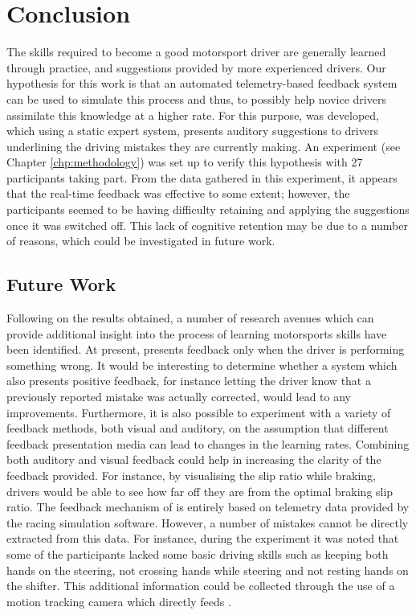 \chapter{Conclusion}
\label{chp:conclusion}
The skills required to become a good motorsport driver are generally learned through practice, and suggestions provided by more experienced drivers. Our hypothesis for this work is that an automated telemetry-based feedback system can be used to simulate this process and thus, to possibly help novice drivers assimilate this knowledge at a higher rate. For this purpose, \methodname was developed, which using a static expert system, presents auditory suggestions to drivers underlining the driving mistakes they are currently making. An experiment (see Chapter \ref{chp:methodology}) was set up to verify this hypothesis with 27 participants taking part. From the data gathered in this experiment, it appears that the real-time feedback was effective to some extent; however, the participants seemed to be having difficulty retaining and applying the suggestions once it was switched off. This lack of cognitive retention may be due to a number of reasons, which could be investigated in future work.

\section{Future Work}
Following on the results obtained, a number of research avenues which can provide additional insight into the process of learning motorsports skills have been identified. At present, \methodname presents feedback only when the driver is performing something wrong. It would be interesting to determine whether a system which also presents positive feedback, for instance letting the driver know that a previously reported mistake was actually corrected, would lead to any improvements. Furthermore, it is also possible to experiment with a variety of feedback methods, both visual and auditory, on the assumption that different feedback presentation media can lead to changes in the learning rates. Combining both auditory and visual feedback could help in increasing the clarity of the feedback provided. For instance, by visualising the slip ratio while braking, drivers would be able to see how far off they are from the optimal braking slip ratio. The feedback mechanism of \methodname is entirely based on telemetry data provided by the racing simulation software. However, a number of mistakes cannot be directly extracted from this data. For instance, during the experiment it was noted that some of the participants lacked some basic driving skills such as keeping both hands on the steering, not crossing hands while steering and not resting hands on the shifter. This additional information could be collected through the use of a motion tracking camera which directly feeds \methodname.   

